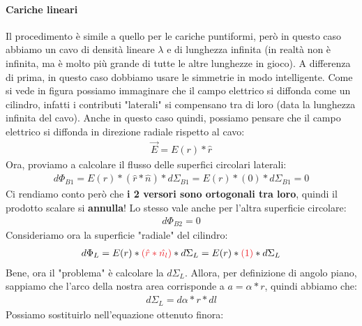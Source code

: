                 \paragraph{Cariche lineari}
                    Il procedimento è simile a quello per le cariche puntiformi, però in questo caso abbiamo un cavo di densità lineare $\lambda$ e di lunghezza infinita (in realtà non è infinita, ma è molto più grande di tutte le altre lunghezze in gioco). A differenza di prima, in questo caso dobbiamo usare le simmetrie in modo intelligente.
                    Come si vede in figura possiamo immaginare che il campo elettrico si diffonda come un cilindro, infatti i contributi "laterali" si compensano tra di loro (data la lunghezza infinita del cavo). Anche in questo caso quindi, possiamo pensare che il campo elettrico si diffonda in direzione radiale rispetto al cavo:
                    \begin{align*}
                        \vec{E}=E(r)*\hat{r}
                    \end{align*}
                    Ora, proviamo a calcolare il flusso delle superfici circolari laterali:
                    \begin{align*}
                        d\Phi_{B1}= E(r)*(\hat{r}*\hat{n})*d\Sigma_{B1} = E(r)*(0)*d\Sigma_{B1} = 0
                    \end{align*}
                    Ci rendiamo conto però che \textbf{i 2 versori sono ortogonali tra loro}, quindi il prodotto scalare si \textbf{annulla}! Lo stesso vale anche per l'altra superficie circolare:
                    \begin{align*}
                        d\Phi_{B2} = 0
                    \end{align*}
                    Consideriamo ora la superficie "radiale" del cilindro:
                    \begin{align*}
                        d\Phi_{L} = E(r)*\textcolor{Red}{(\hat{r}*\hat{n_l})}*d\Sigma_L = E(r)*\textcolor{Red}{(1)}*d\Sigma_L
                    \end{align*}
                    Bene, ora il "problema" è calcolare la $d\Sigma_L$. Allora, per definizione di angolo piano, sappiamo che l'arco della nostra area corrisponde a $a=\alpha*r$, quindi abbiamo che:
                    \begin{align*}
                        d\Sigma_L=d\alpha*r*dl
                    \end{align*}
                    Possiamo sostituirlo nell'equazione ottenuto finora:
